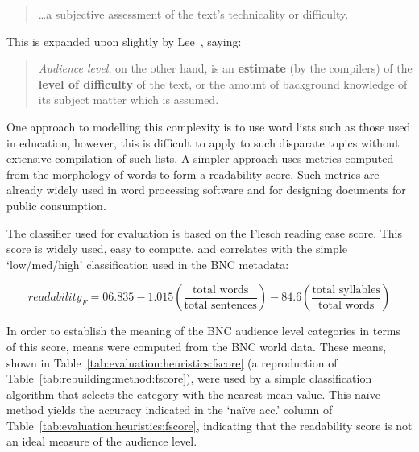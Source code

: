 \begin{quote}
\ldots{}a subjective assessment of the text's technicality or difficulty.
\end{quote}

This is expanded upon slightly by Lee~\cite[p. 68]{lee2001genres}, saying:

\begin{quote}
    \textsl{Audience level}, on the other hand, is an \textbf{estimate} (by the compilers) of the \textbf{level of difficulty} of the text, or the amount of background knowledge of its subject matter which is assumed.
\end{quote}

One approach to modelling this complexity is to use word lists such as those used in education, however, this is difficult to apply to such disparate topics without extensive compilation of such lists.  A simpler approach uses metrics computed from the morphology of words to form a readability score.  Such metrics are already widely used in word processing software and for designing documents for public consumption.


The classifier used for evaluation is based on the Flesch reading ease score\cite{flesch1948new}.  This score is widely used, easy to compute, and correlates with the simple `low/med/high' classification used in the BNC metadata:

$$
readability_{F} = 06.835 - 1.015 \left( \frac{\text{total words}}{\text{total sentences}} \right) - 84.6 \left( \frac{\text{total syllables}}{\text{total words}} \right)
$$





In order to establish the meaning of the BNC audience level categories in terms of this score, means were computed from the BNC world data.  These means, shown in Table~\ref{tab:evaluation:heuristics:fscore} (a reproduction of Table~\ref{tab:rebuilding:method:fscore}), were used by a simple classification algorithm that selects the category with the nearest mean value.  This na\"ive method yields the accuracy indicated in the `na\"ive acc.' column of Table~\ref{tab:evaluation:heuristics:fscore}, indicating that the readability score is not an ideal measure of the audience level.

